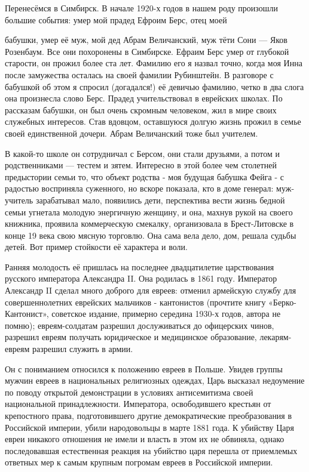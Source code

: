 \label{121-2}
Перенесёмся в Симбирск. В начале 1920-х годов в нашем роду произошли большие события: умер мой прадед Ефроим Берс, отец моей 

\label{122-1}
бабушки, умер её муж, мой дед Абрам Величанский, муж тёти Сони — Яков Розенбаум. Все они похоронены в Симбирске. Ефраим Берс умер от глубокой старости, он прожил более ста лет. Фамилию его я назвал точно, когда моя Инна после замужества осталась на своей фамилии Рубинштейн. В разговоре с бабушкой об этом я спросил (догадался!) её девичью фамилию, четко в два слога она произнесла слово Берс. Прадед учительствовал в еврейских школах. По рассказам бабушки, он был очень скромным человеком, жил в мире своих служебных интересов. Став вдовцом, оставшуюся долгую жизнь прожил в семье своей единственной дочери. Абрам Величанский тоже был учителем.

\label{123-1}
В какой-то школе он сотрудничал с Берсом, они стали друзьями, а потом и родственниками — тестем и зятем. Интересно в этой более чем столетней предыстории семьи то, что объект родства - моя будущая бабушка Фейга - с радостью восприняла суженного, но вскоре показала, кто в доме генерал: муж-учитель зарабатывал мало, появились дети, перспектива вести жизнь бедной семьи угнетала молодую энергичную женщину, и она, махнув рукой на своего книжника, проявила коммерческую смекалку, организовала в Брест-Литовске в конце 19 века свою мясную торговлю. Она сама вела дело, дом, решала судьбы детей. Вот пример стойкости её характера и воли.

\label{124-1}
 Ранняя молодость её пришлась на последнее двадцатилетие царствования русского императора Александра II. Она родилась в 1861 году. Император Александр II сделал много доброго для евреев: отменил армейскую службу для совершеннолетних еврейских мальчиков - кантонистов (прочтите книгу «Берко-Кантонист», советское издание, примерно середина 1930-х годов, автора не помню); евреям-солдатам разрешил дослуживаться до офицерских чинов, разрешил евреям получать юридическое и медицинское образование, лекарям-евреям разрешил служить в армии.

\label{125-1}
Он с пониманием относился к положению евреев в Польше. Увидев группы мужчин евреев в национальных религиозных одеждах, Царь высказал недоумение по поводу открытой демонстрации в условиях антисемитизма своей национальной принадлежности. Императора, освободившего крестьян от крепостного права, подготовившего другие демократические преобразования в Российской империи, убили народовольцы в марте 1881 года. К убийству Царя евреи никакого отношения не имели и власть в этом их не обвиняла, однако последовавшая естественная реакция на убийство царя перешла от приемлемых ответных мер к самым крупным погромам евреев в Российской империи.

